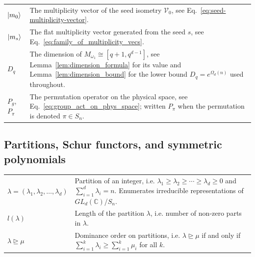 \documentclass[10pt,twocolumn,superscriptaddress,aps,amsmath,amssymb,citeautoscript,floatfix,prx]{revtex4-2}
\theoremstyle{plain}
\theoremstyle{plain}
\theoremstyle{plain}
\theoremstyle{plain}
\theoremstyle{plain}
\theoremstyle{plain}
\theoremstyle{plain}
\theoremstyle{definition}
\theoremstyle{plain}
\begin{document}
\begin{appendix}
\begin{tabular}{@{}ll@{}}
\parbox[t]{0.22\textwidth}{$\ket{m_0}$} & \parbox[t]{0.72\textwidth}{The multiplicity vector of the seed isometry $\mathcal{V}_0$, see Eq.~\eqref{eq:seed-multiplicity-vector}.} \\[0.6em]

\parbox[t]{0.22\textwidth}{$\ket{m_s}$} & \parbox[t]{0.72\textwidth}{The flat multiplicity vector generated from the seed $s$, see Eq.~\eqref{eq:family_of_multiplicity_vecs}.} \\[0.6em]

\parbox[t]{0.22\textwidth}{$D_q$} & \parbox[t]{0.72\textwidth}{The dimension of $M_{\omega_1}\cong[q+1,q^{d-1}]$, see Lemma~\ref{lem:dimension_formula} for its value and Lemma~\ref{lem:dimension_bound} for the lower bound $D_q=e^{\Omega_d(n)}$ used throughout}. \\[0.6em]

\parbox[t]{0.22\textwidth}{$P_g$, $P_\pi$} & \parbox[t]{0.72\textwidth}{The permutation operator on the physical space, see Eq.~\eqref{eq:group_act_on_phys_space}; written $P_\pi$ when the permutation is denoted $\pi\in S_n$.} \\[0.6em]

\end{tabular}


\subsection*{Partitions, Schur functors, and symmetric polynomials}

\begin{tabular}{@{}ll@{}}

\parbox[t]{0.22\textwidth}{$\lambda=(\lambda_1,\lambda_2,\ldots,\lambda_d)$} & \parbox[t]{0.72\textwidth}{Partition of an integer, i.e. $\lambda_1\geq \lambda_2 \geq \cdots \geq \lambda_d\geq 0$ and $\sum_{i=1}^d \lambda_i=n$. Enumerates irreducible representations of $GL_d(\mathbb{C})$/$S_n$.} \\[0.6em]

\parbox[t]{0.22\textwidth}{$l(\lambda)$} & \parbox[t]{0.72\textwidth}{Length of the partition $\lambda$, i.e. number of non-zero parts in $\lambda$.} \\[0.6em]

\parbox[t]{0.22\textwidth}{$\lambda \unrhd \mu$} & \parbox[t]{0.72\textwidth}{Dominance order on partitions, i.e. $\lambda \unrhd \mu$ if and only if $\sum_{i=1}^k \lambda_i \geq \sum_{i=1}^k \mu_i$ for all $k$.} \\[0.6em]


\end{tabular}
\end{appendix}
\end{document}

